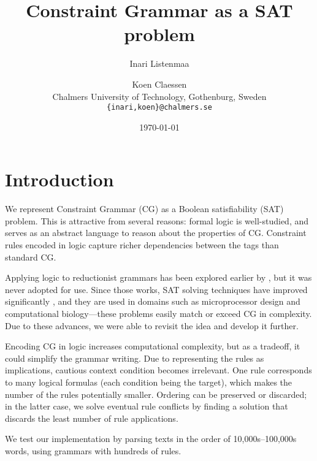 \documentclass[11pt]{article}
\title{Constraint Grammar as a SAT problem}
\author{Inari Listenmaa \and Koen Claessen \\
 Chalmers University of Technology, Gothenburg, Sweden \\
 {\tt \{inari,koen\}@chalmers.se} }
\date{\today}
\begin{document}
\maketitle



\section{Introduction}

We represent Constraint Grammar (CG) \cite{karlsson1995constraint} 
as a Boolean satisfiability (SAT) problem.
This is attractive from several reasons: formal logic is
well-studied, and serves as an abstract language to reason about the
properties of CG. Constraint rules encoded in logic capture richer
dependencies between the tags than standard CG.

Applying logic to reductionist grammars has been explored earlier by \cite{lager98,lager_nivre01}, but it was never adopted for use.
Since those works, SAT solving techniques have improved significantly \cite{marques_silva2010}, and they are used in domains such as microprocessor design and computational 
biology---these problems easily match or exceed CG in complexity. 
Due to these advances, we were able to revisit the idea and develop it
further. 

Encoding CG in logic increases computational complexity, 
but as a tradeoff, it could simplify the grammar writing.
Due to representing the rules as implications, cautious context
condition becomes irrelevant.
One rule corresponds to many logical formulas (each condition being
the target), which makes the number of the rules potentially smaller.
Ordering can be preserved or discarded; in the latter case, we solve
eventual rule conflicts by finding a solution that discards the least
number of rule applications.

We test our implementation by parsing texts in the order of
10,000s--100,000s words, using grammars with hundreds of rules.



\end{document}
